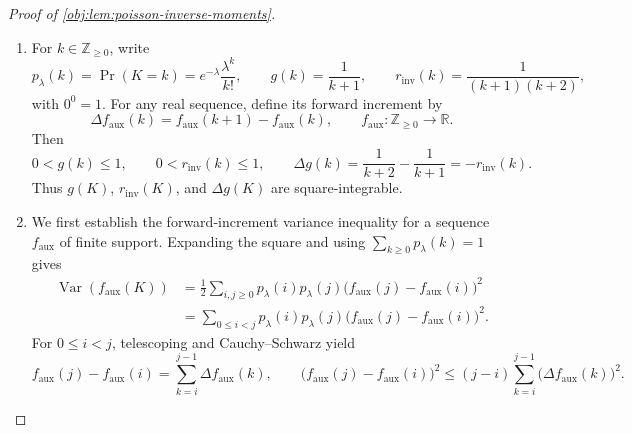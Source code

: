 \begin{proof}[Proof of \cref{obj:lem:poisson-inverse-moments}]
\begin{enumerate}
\item For \(k\in\mathbb Z_{\ge0}\), write
\[
p_\lambda(k)=\Pr(K=k)=e^{-\lambda}\frac{\lambda^k}{k!},
\qquad
g(k)=\frac1{k+1},
\qquad
r_{\mathrm{inv}}(k)=\frac1{(k+1)(k+2)},
\]
with \(0^0=1\). For any real sequence, define its forward increment by
\[
\Delta f_{\mathrm{aux}}(k)
=f_{\mathrm{aux}}(k+1)-f_{\mathrm{aux}}(k),
\qquad
f_{\mathrm{aux}}\colon\mathbb Z_{\ge0}\to\mathbb R.
\]
Then
\[
0<g(k)\le1,\qquad 0<r_{\mathrm{inv}}(k)\le1,
\qquad
\Delta g(k)
=\frac1{k+2}-\frac1{k+1}
=-r_{\mathrm{inv}}(k).
\]
Thus \(g(K)\), \(r_{\mathrm{inv}}(K)\), and \(\Delta g(K)\) are square-integrable. %

\item We first establish the forward-increment variance inequality for a sequence \(f_{\mathrm{aux}}\) of finite support. Expanding the square and using \(\sum_{k\ge0}p_\lambda(k)=1\) gives
\[
\begin{aligned}
\operatorname{Var}(f_{\mathrm{aux}}(K))
&=\frac12\sum_{i,j\ge0}p_\lambda(i)p_\lambda(j)
  \bigl(f_{\mathrm{aux}}(j)-f_{\mathrm{aux}}(i)\bigr)^2\\
&=\sum_{0\le i<j}p_\lambda(i)p_\lambda(j)
  \bigl(f_{\mathrm{aux}}(j)-f_{\mathrm{aux}}(i)\bigr)^2.
\end{aligned}
\]
For \(0\le i<j\), telescoping and Cauchy--Schwarz yield
\[
f_{\mathrm{aux}}(j)-f_{\mathrm{aux}}(i)
=\sum_{k=i}^{j-1}\Delta f_{\mathrm{aux}}(k),
\qquad
\bigl(f_{\mathrm{aux}}(j)-f_{\mathrm{aux}}(i)\bigr)^2
\le (j-i)\sum_{k=i}^{j-1}\bigl(\Delta f_{\mathrm{aux}}(k)\bigr)^2.
\]


\end{enumerate}
\end{proof}
